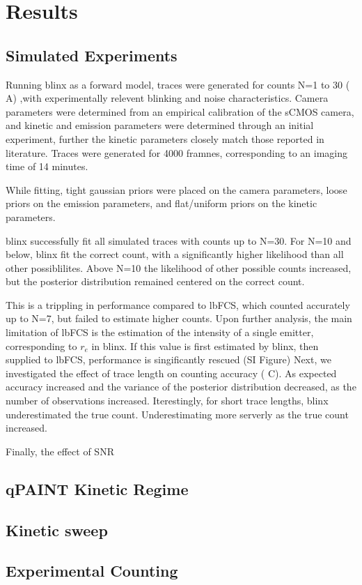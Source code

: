 \section{Results}

\subsection{Simulated Experiments}
Running blinx as a forward model, traces were generated for counts N=1 to 30
	( A) ,with experimentally relevent blinking and noise characteristics.
	Camera parameters were determined from an empirical calibration of the
	sCMOS camera, and kinetic and emission parameters were determined through an
	initial experiment, further the kinetic parameters closely match those reported
	in literature.
	Traces were generated for 4000 framnes, corresponding to an imaging time of 
	14 minutes.

While fitting, tight gaussian priors were placed on the camera parameters,
	loose priors on the emission parameters, and flat/uniform priors on the
	kinetic parameters. 

blinx successfully fit all simulated traces with counts up to N=30.
	For N=10 and below, blinx fit the correct count, with a significantly higher
	likelihood than all other possiblilites. Above N=10 the likelihood of other 
	possible counts increased, but the posterior distribution remained
	centered on the correct count.

This is a trippling in performance compared to lbFCS, which counted accurately up
	to N=7, but failed to estimate higher counts.
	Upon further analysis, the main limitation of lbFCS is the estimation of the 
	intensity of a single emitter, corresponding to $r_e$ in blinx. If this value is 
	first estimated by blinx, then supplied to lbFCS, performance is singificantly 
	rescued (SI Figure)
Next, we investigated the effect of trace length on counting accuracy ( C).
	As expected accuracy increased and the variance of the posterior distribution decreased, 
	as the number of observations increased.
	Iterestingly, for short trace lengths, blinx underestimated the true count. Underestimating 
	more serverly as the true count increased.

Finally, the effect of SNR


\subsection{qPAINT Kinetic Regime}



\subsection{Kinetic sweep}

\subsection{Experimental Counting}
